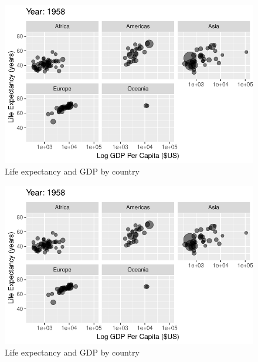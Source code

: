 \documentclass[
  letterpaper,
  DIV=11,
  numbers=noendperiod]{scrreport}
\theoremstyle{definition}
\theoremstyle{remark}
\begin{document}
\begin{figure}

{\centering \includegraphics{index_files/figure-pdf/fig-anim-lifegdp-11.pdf}

}

\caption{\label{fig-anim-lifegdp-11}Life expectancy and GDP by country}

\end{figure}

\begin{figure}

{\centering \includegraphics{index_files/figure-pdf/fig-anim-lifegdp-12.pdf}

}

\caption{\label{fig-anim-lifegdp-12}Life expectancy and GDP by country}

\end{figure}
\end{document}
